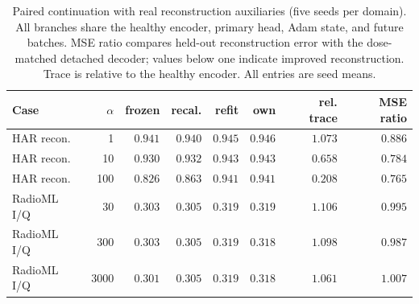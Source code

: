 \begin{table}[t]
\centering
\caption{Paired continuation with real reconstruction auxiliaries (five seeds per domain). All branches share the healthy encoder, primary head, Adam state, and future batches. MSE ratio compares held-out reconstruction error with the dose-matched detached decoder; values below one indicate improved reconstruction. Trace is relative to the healthy encoder. All entries are seed means.}
\label{tab:reconstruction_paired}
\small
\begin{tabular}{lrrrrrrr}
\toprule
Case & $\alpha$ & frozen & recal. & refit & own & rel. trace & MSE ratio \\
\midrule
HAR recon. & 1 & $0.941$ & $0.940$ & $0.945$ & $0.946$ & $1.073$ & $0.886$ \\
HAR recon. & 10 & $0.930$ & $0.932$ & $0.943$ & $0.943$ & $0.658$ & $0.784$ \\
HAR recon. & 100 & $0.826$ & $0.863$ & $0.941$ & $0.941$ & $0.208$ & $0.765$ \\
\midrule
RadioML I/Q & 30 & $0.303$ & $0.305$ & $0.319$ & $0.319$ & $1.106$ & $0.995$ \\
RadioML I/Q & 300 & $0.303$ & $0.305$ & $0.319$ & $0.318$ & $1.098$ & $0.987$ \\
RadioML I/Q & 3000 & $0.301$ & $0.305$ & $0.319$ & $0.318$ & $1.061$ & $1.007$ \\
\bottomrule
\end{tabular}
\end{table}
